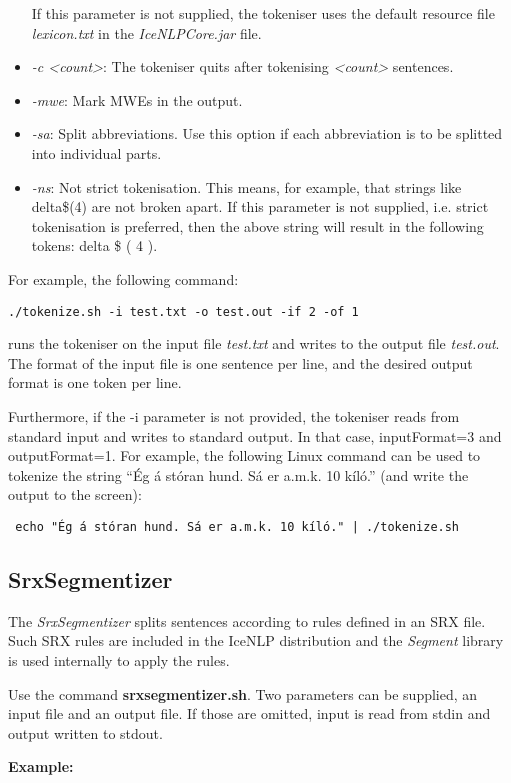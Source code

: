 \documentclass[11pt]{article}
\begin{document}
\begin{itemize}
If this parameter is not supplied, the tokeniser uses the default resource file \emph{lexicon.txt} in the \emph{IceNLPCore.jar} file.
\item \emph{-c <count>}: The tokeniser quits after tokenising \emph{<count>} sentences.
\item \emph{-mwe}: Mark MWEs in the output. 
\item \emph{-sa}: Split abbreviations. Use this option if each abbreviation is to be splitted into individual parts.
\item \emph{-ns}: Not strict tokenisation. This means, for example, that strings like delta\$(4) are not broken apart. If this parameter is not supplied, i.e. strict tokenisation is preferred, then the above string will result in the following tokens: delta \$ ( 4 ).
\end{itemize}

For example, the following command:
\begin{verbatim}
./tokenize.sh -i test.txt -o test.out -if 2 -of 1
\end{verbatim}
runs the tokeniser on the input file \emph{test.txt} and writes to the output file \emph{test.out}.
The format of the input file is one sentence per line, and the desired output format is one token per line.

Furthermore, if the -i parameter is not provided, the tokeniser reads from standard input and writes to standard output. In that case, inputFormat=3 and outputFormat=1. For example, the following Linux command can be used to tokenize the string ``Ég á stóran hund. Sá er a.m.k. 10 kíló.'' (and write the output to the screen): 
\begin{verbatim}
 echo "Ég á stóran hund. Sá er a.m.k. 10 kíló." | ./tokenize.sh
\end{verbatim}

\subsection{SrxSegmentizer}
The \textit{SrxSegmentizer} splits sentences according to rules defined in an SRX file. Such SRX rules are included in the IceNLP distribution and the \textit{Segment} library is used internally to apply the rules.

Use the command \textbf{srxsegmentizer.sh}. Two parameters can be supplied, an input file
and an output file. If those are omitted, input is read from stdin and output written to
stdout.

\textbf{Example:}
\end{document}
